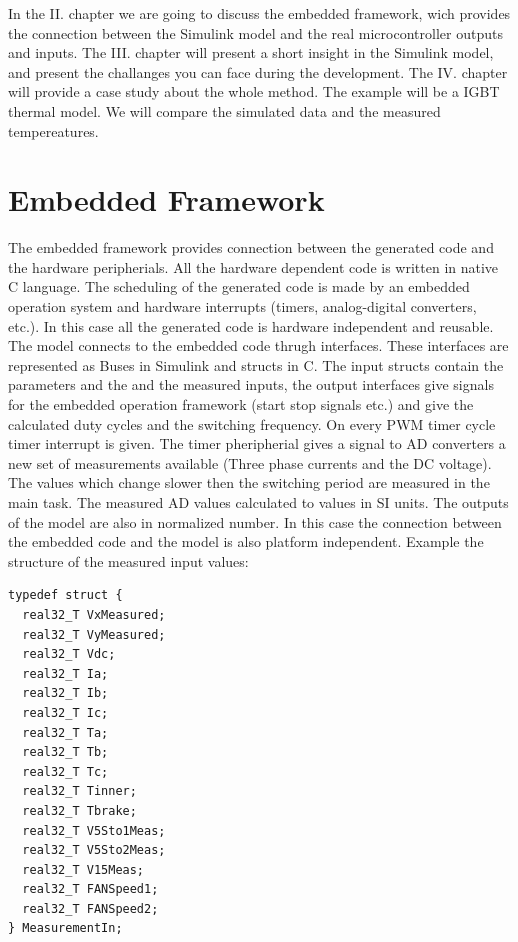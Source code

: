 In the II. chapter we are going to discuss the embedded framework, wich provides the connection between the Simulink model and the real microcontroller outputs and inputs. The III. chapter will present a short insight in the Simulink model, and present the challanges you can face during the development. The IV. chapter will provide a case study about the whole method. The example will be a IGBT thermal model. We will compare the simulated data and the measured tempereatures.


\section{Embedded Framework}

The embedded framework provides connection between the generated code and the hardware peripherials. All the hardware dependent code is written in native C language. The scheduling of the generated code is made by an embedded operation system and hardware interrupts (timers, analog-digital converters, etc.). In this case all the generated code is hardware independent and reusable. The model connects to the embedded code thrugh interfaces. These interfaces are represented as Buses in Simulink and structs in C. The input structs contain the parameters and the and the measured inputs, the output interfaces give signals for the embedded operation framework (start stop signals etc.) and give the calculated duty cycles and the switching frequency. 
On every PWM timer cycle timer interrupt is given. The timer pheripherial gives a signal to AD converters a new set of measurements available (Three phase currents and the DC voltage). The values which change slower then the switching period are measured in the main task. The measured AD values calculated to values in SI units. The outputs of the model are also in normalized number. In this case the connection between the embedded code and the model is also platform independent. Example the structure of the measured input values:

\begin{absolutelynopagebreak}
\begin{lstlisting}
typedef struct { 
  real32_T VxMeasured; 
  real32_T VyMeasured; 
  real32_T Vdc; 
  real32_T Ia; 
  real32_T Ib; 
  real32_T Ic; 
  real32_T Ta; 
  real32_T Tb; 
  real32_T Tc; 
  real32_T Tinner; 
  real32_T Tbrake; 
  real32_T V5Sto1Meas; 
  real32_T V5Sto2Meas; 
  real32_T V15Meas; 
  real32_T FANSpeed1; 
  real32_T FANSpeed2; 
} MeasurementIn;

\end{lstlisting}
\end{absolutelynopagebreak}

